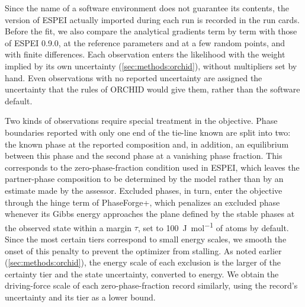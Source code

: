 Since the name of a software environment does not guarantee its contents, the version of ESPEI actually imported during each run is recorded in the run cards. Before the fit, we also compare the analytical gradients term by term with those of ESPEI 0.9.0, at the reference parameters and at a few random points, and with finite differences. Each observation enters the likelihood with the weight implied by its own uncertainty (\cref{sec:methods:orchid}), without multipliers set by hand. Even observations with no reported uncertainty are assigned the uncertainty that the rules of ORCHID would give them, rather than the software default.

Two kinds of observations require special treatment in the objective. Phase boundaries reported with only one end of the tie-line known are split into two: the known phase at the reported composition and, in addition, an equilibrium between this phase and the second phase at a vanishing phase fraction. This corresponds to the zero-phase-fraction condition used in ESPEI, which leaves the partner-phase composition to be determined by the model rather than by an estimate made by the assessor. Excluded phases, in turn, enter the objective through the hinge term of PhaseForge+, which penalizes an excluded phase whenever its Gibbs energy approaches the plane defined by the stable phases at the observed state within a margin $\tau$, set to \qty{100}{\J\per\mole} of atoms by default. Since the most certain tiers correspond to small energy scales, we smooth the onset of this penalty to prevent the optimizer from stalling. As noted earlier (\cref{sec:methods:orchid}), the energy scale of each exclusion is the larger of the certainty tier and the state uncertainty, converted to energy. We obtain the driving-force scale of each zero-phase-fraction record similarly, using the record's uncertainty and its tier as a lower bound.

